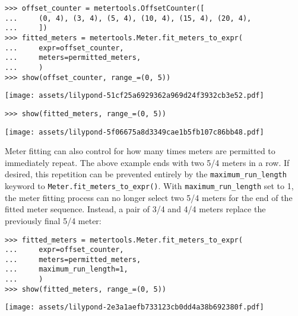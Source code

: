 \begin{comment}
<abjad>
offset_counter = metertools.OffsetCounter([
    (0, 4), (3, 4), (5, 4), (10, 4), (15, 4), (20, 4),
    ])
fitted_meters = metertools.Meter.fit_meters_to_expr(
    expr=offset_counter,
    meters=permitted_meters,
    )
show(offset_counter, range_=(0, 5))
show(fitted_meters, range_=(0, 5))
</abjad>
\end{comment}

\begin{abjadbookoutput}
\begin{singlespacing}
\vspace{-0.5\baselineskip}
\begin{verbatim}
>>> offset_counter = metertools.OffsetCounter([
...     (0, 4), (3, 4), (5, 4), (10, 4), (15, 4), (20, 4),
...     ])
>>> fitted_meters = metertools.Meter.fit_meters_to_expr(
...     expr=offset_counter,
...     meters=permitted_meters,
...     )
>>> show(offset_counter, range_=(0, 5))
\end{verbatim}
\noindent\texttt{[image: assets/lilypond-51cf25a6929362a969d24f3932cb3e52.pdf]}
\begin{verbatim}
>>> show(fitted_meters, range_=(0, 5))
\end{verbatim}
\noindent\texttt{[image: assets/lilypond-5f06675a8d3349cae1b5fb107c86bb48.pdf]}
\end{singlespacing}
\end{abjadbookoutput}

\noindent Meter fitting can also control for how many times meters are
permitted to immediately repeat. The above example ends with two 5/4 meters in
a row. If desired, this repetition can be prevented entirely by the
\texttt{maximum\_run\_length} keyword to
\texttt{Meter.fit\_meters\_to\_expr()}. With \texttt{maximum\_run\_length} set
to 1, the meter fitting process can no longer select two 5/4 meters for the end
of the fitted meter sequence. Instead, a pair of 3/4 and 4/4 meters replace the
previously final 5/4 meter:

\begin{comment}
<abjad>
fitted_meters = metertools.Meter.fit_meters_to_expr(
    expr=offset_counter,
    meters=permitted_meters,
    maximum_run_length=1,
    )
show(fitted_meters, range_=(0, 5))
</abjad>
\end{comment}

\begin{abjadbookoutput}
\begin{singlespacing}
\vspace{-0.5\baselineskip}
\begin{verbatim}
>>> fitted_meters = metertools.Meter.fit_meters_to_expr(
...     expr=offset_counter,
...     meters=permitted_meters,
...     maximum_run_length=1,
...     )
>>> show(fitted_meters, range_=(0, 5))
\end{verbatim}
\noindent\texttt{[image: assets/lilypond-2e3a1aefb733123cb0dd4a38b692380f.pdf]}
\end{singlespacing}
\end{abjadbookoutput}


